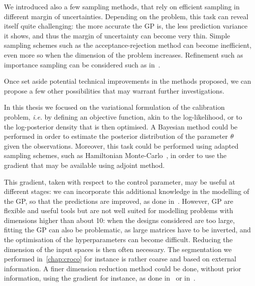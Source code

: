 \documentclass[../../Main_ManuscritThese.tex]{subfiles}
\begin{document}
We introduced also a few sampling methods, that rely on efficient
sampling in different margin of uncertainties. Depending on the
problem, this task can reveal itself quite challenging: the more
accurate the GP is, the less prediction variance it shows, and thus
the margin of uncertainty can become very thin. Simple sampling
schemes such as the acceptance-rejection method can become
inefficient, even more so when the dimension of the problem
increases. Refinement such as importance sampling can be considered
such as in~\cite{razaaly_rare_2019}.

Once set aside potential technical improvements in the methods
proposed, we can propose a few other possibilities that may warrant
further investigations.

In this thesis we focused on the variational
formulation of the calibration problem, \emph{i.e.} by defining an
objective function, akin to the log-likelihood, or to the
log-posterior density that is then optimised. A Bayesian method could
be performed in order to estimate the posterior distribution of the
parameter $\theta$ given the observations. Moreover, this task could be
performed using adapted sampling schemes, such as Hamiltonian
Monte-Carlo~\cite{betancourt_conceptual_2017}, in order to use the
gradient that may be available using adjoint method.

This gradient, taken with respect to the control parameter, may be
useful at different stages: we can incorporate this additional
knowledge in the modelling of the GP, so that the predictions are
improved, as done
in~\cite{bouhlel_gradient-enhanced_2019,laurent_overview_2019}.
However, GP are flexible and useful tools but are not well suited for
modelling problems with dimensions higher than about 10: when the
designs considered are too large, fitting the GP can also be
problematic, as large matrices have to be inverted, and the
optimisation of the hyperparameters can become difficult. Reducing the
dimension of the input spaces is then often necessary.
The segmentation we performed in~\cref{chap:croco} for instance is
rather coarse and based on external information. A finer dimension
reduction method could be done, without prior information, using the
gradient for instance, as done in~\cite{benameur_refinement_2002} or
in~\cite{zahm_certified_2018}.
\end{document}
